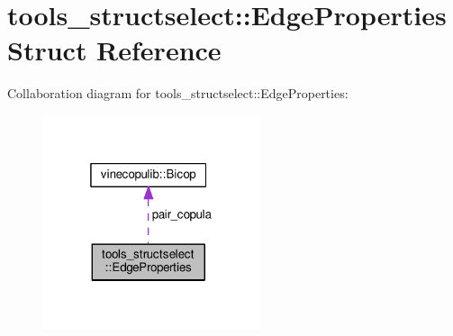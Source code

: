 \hypertarget{structtools__structselect_1_1_edge_properties}{}\section{tools\+\_\+structselect\+:\+:Edge\+Properties Struct Reference}
\label{structtools__structselect_1_1_edge_properties}


Collaboration diagram for tools\+\_\+structselect\+:\+:Edge\+Properties\+:
\nopagebreak
\begin{figure}[H]
\begin{center}
\leavevmode
\includegraphics[width=181pt]{structtools__structselect_1_1_edge_properties__coll__graph}
\end{center}
\end{figure}
